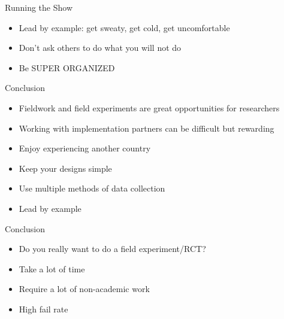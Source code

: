 \documentclass[
  ignorenonframetext,
]{beamer}
\providecommand{\tightlist}{%
  \setlength{\itemsep}{0pt}\setlength{\parskip}{0pt}}
\begin{document}
\begin{frame}{Running the Show}
\protect\hypertarget{running-the-show-1}{}
\begin{itemize}
\tightlist
\item
  Lead by example: get sweaty, get cold, get uncomfortable
\item
  Don't ask others to do what you will not do
\item
  Be SUPER ORGANIZED
\end{itemize}
\end{frame}

\begin{frame}{Conclusion}
\protect\hypertarget{conclusion}{}
\begin{itemize}
\tightlist
\item
  Fieldwork and field experiments are great opportunities for
  researchers
\item
  Working with implementation partners can be difficult but rewarding
\item
  Enjoy experiencing another country
\item
  Keep your designs simple
\item
  Use multiple methods of data collection
\item
  Lead by example
\end{itemize}
\end{frame}

\begin{frame}{Conclusion}
\protect\hypertarget{conclusion-1}{}
\begin{itemize}
\tightlist
\item
  Do you really want to do a field experiment/RCT?
\end{itemize}

\medskip

\begin{itemize}
\tightlist
\item
  Take a lot of time
\item
  Require a lot of non-academic work
\item
  High fail rate
\end{itemize}
\end{frame}
\end{document}
